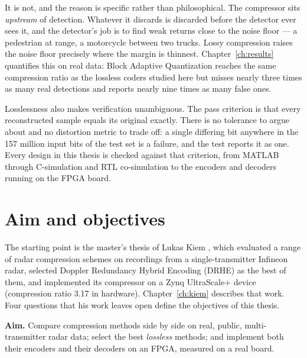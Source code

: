It is not, and the reason is specific rather than philosophical. The
compressor sits \emph{upstream} of detection. Whatever it discards is discarded
before the detector ever sees it, and the detector's job is to find weak
returns close to the noise floor --- a pedestrian at range, a motorcycle between
two trucks. Lossy compression raises the noise floor precisely where the margin
is thinnest. Chapter~\ref{ch:results} quantifies this on real data: Block
Adaptive Quantization reaches the same compression ratio as the lossless coders
studied here but misses nearly three times as many real detections and reports
nearly nine times as many false ones.

Losslessness also makes verification unambiguous. The pass criterion is that
every reconstructed sample equals its original exactly. There is no tolerance
to argue about and no distortion metric to trade off: a single differing bit
anywhere in the \num{157} million input bits of the test set is a failure, and
the test reports it as one. Every design in this thesis is checked against that
criterion, from MATLAB through C-simulation and RTL co-simulation to the
encoders and decoders running on the FPGA board.

\section{Aim and objectives}
\label{sec:objectives}

The starting point is the master's thesis of Lukas Kiem \cite{kiem2025}, which
evaluated a range of radar compression schemes on recordings from a
single-transmitter Infineon radar, selected Doppler Redundancy Hybrid Encoding
(DRHE) as the best of them, and implemented its compressor on a Zynq
UltraScale+ device (compression ratio \num{3.17} in hardware). Chapter~\ref{ch:kiem}
describes that work. Four questions that his work leaves open define the
objectives of this thesis.

\begin{keybox}
\textbf{Aim.} Compare compression methods side by side on real, public,
multi-transmitter radar data; select the best \emph{lossless} methods; and
implement both their encoders and their decoders on an FPGA, measured on a
real board.
\end{keybox}

